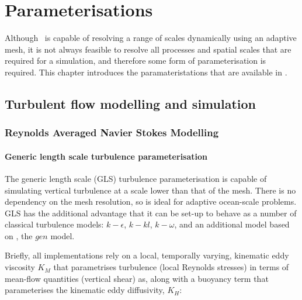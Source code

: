 \chapter{Parameterisations}\label{chap:parameterisations}

Although \fluidity\ is capable of resolving a range of scales dynamically using
an adaptive mesh, it is not always feasible to resolve all processes and spatial scales that are
required for a simulation, and therefore some form of parameterisation is required.
This chapter introduces the paramateristations that are available in \fluidity.

\section{Turbulent flow modelling and simulation}
\label{sec:turbulence_parametrisations}

\subsection{Reynolds Averaged Navier Stokes Modelling}
\label{sec:RANS}

\subsubsection{Generic length scale turbulence parameterisation}\label{sec:GLS}

The generic length scale (GLS) turbulence parameterisation is capable of simulating vertical
turbulence at a scale lower than that of the mesh. There is no dependency on the mesh resolution,
so is ideal for adaptive ocean-scale problems. GLS has the additional advantage that it
can be set-up to behave as a number of classical turbulence models:
$k-\epsilon$, $k-kl$, $k-\omega$,
and an additional model based on \citet{umlauf2003}, the $gen$ model.

Briefly, all implementations rely on a local, temporally varying, kinematic eddy
viscosity $K_M$ that parametrises turbulence (local Reynolds stresses) in terms of mean-flow
quantities (vertical shear) as, along
with a buoyancy term that parameterises the kinematic eddy diffusivity, $K_H$:

